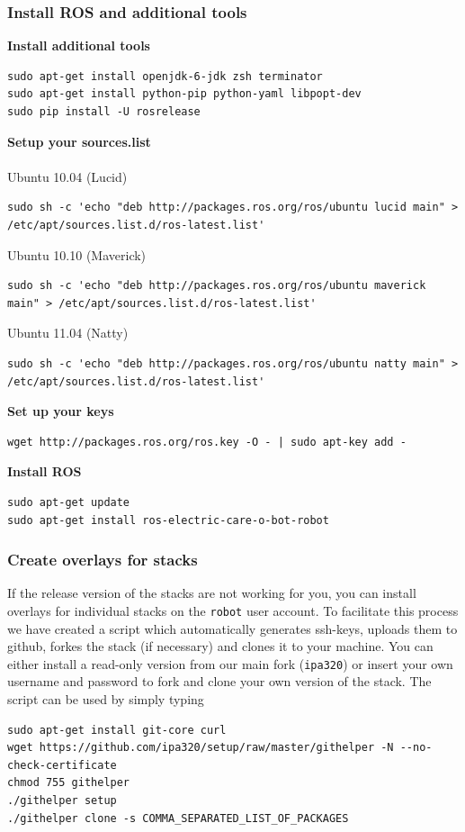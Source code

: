 \subsubsection{Install ROS and additional tools}
\textbf{Install additional tools}
\begin{lstlisting}
sudo apt-get install openjdk-6-jdk zsh terminator
sudo apt-get install python-pip python-yaml libpopt-dev
sudo pip install -U rosrelease
\end{lstlisting}
\textbf{Setup your sources.list}
\\
\\Ubuntu 10.04 (Lucid)
\begin{lstlisting}
sudo sh -c 'echo "deb http://packages.ros.org/ros/ubuntu lucid main" > /etc/apt/sources.list.d/ros-latest.list'
\end{lstlisting}
Ubuntu 10.10 (Maverick)
\begin{lstlisting}
sudo sh -c 'echo "deb http://packages.ros.org/ros/ubuntu maverick main" > /etc/apt/sources.list.d/ros-latest.list'
\end{lstlisting}
Ubuntu 11.04 (Natty)
\begin{lstlisting}
sudo sh -c 'echo "deb http://packages.ros.org/ros/ubuntu natty main" > /etc/apt/sources.list.d/ros-latest.list'
\end{lstlisting}
\textbf{Set up your keys}
\begin{lstlisting}
wget http://packages.ros.org/ros.key -O - | sudo apt-key add -
\end{lstlisting}
\textbf{Install ROS}
\begin{lstlisting}
sudo apt-get update
sudo apt-get install ros-electric-care-o-bot-robot
\end{lstlisting}

\subsubsection{Create overlays for stacks}
If the release version of the stacks are not working for you, you can install overlays for individual stacks on the \texttt{robot} user account. To facilitate this process we have created a script which automatically generates ssh-keys, uploads them to github, forkes the stack (if necessary) and clones it to your machine. You can either install a read-only version from our main fork (\texttt{ipa320}) or insert your own username and password to fork and clone your own version of the stack. The script can be used by simply typing
\begin{lstlisting}
sudo apt-get install git-core curl
wget https://github.com/ipa320/setup/raw/master/githelper -N --no-check-certificate
chmod 755 githelper
./githelper setup
./githelper clone -s COMMA_SEPARATED_LIST_OF_PACKAGES
\end{lstlisting}

